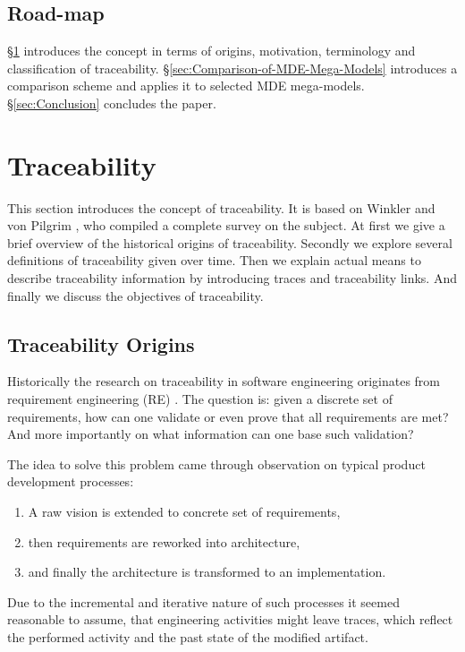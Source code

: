 \documentclass[runningheads,a4paper]{llncs}
\begin{document}
\subsection{Road-map}
\label{ssec:Road;ap}
§\ref{sec:Traceability} introduces the concept in terms of origins, motivation, terminology and classification of traceability.
§\ref{sec:Comparison-of-MDE-Mega-Models} introduces a comparison scheme and applies it to selected MDE mega-models.
§\ref{sec:Conclusion} concludes the paper.



\section{Traceability}
\label{sec:Traceability}
This section introduces the concept of traceability.
It is based  on Winkler and von Pilgrim \cite{TraceabilitySurvey}, who compiled a complete survey on the subject.
At first we give a brief overview of the historical origins of traceability.
Secondly we explore several definitions of traceability given over time.
Then we explain actual means to describe traceability information by introducing traces and traceability links.
And finally we discuss the objectives of traceability.


\subsection{Traceability Origins}
\label{subsec:Traceability-Origins}
Historically the research on traceability in software engineering originates from requirement engineering (RE) \cite{TraceabilitySurvey}. 
The question is: given a discrete set of requirements, how can one validate or even prove that all requirements are met? 
And more importantly on what information can one base such validation? 

The idea to solve this problem came through observation on typical product development processes:
\begin{enumerate}

\item
A raw vision is extended to concrete set of requirements,

\item
then requirements are reworked into architecture,

\item
and finally the architecture is transformed to an implementation.

\end{enumerate}
Due to the incremental and iterative nature of such processes it seemed reasonable to assume, that engineering activities might leave traces, which reflect the performed activity and the past state of the modified artifact.
\end{document}
